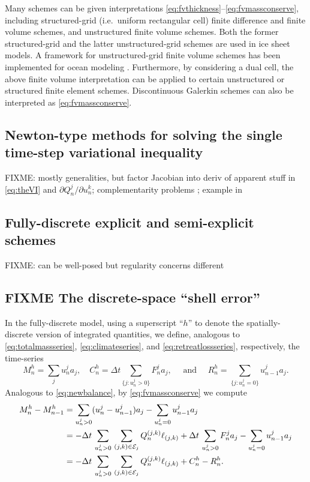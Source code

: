 \documentclass[final,leqno,onefignum,onetabnum]{siamltex1213bueler}
\begin{document}
Many schemes can be given interpretations \eqref{eq:fvthickness}--\eqref{eq:fvmassconserve}, including structured-grid (i.e.~uniform rectangular cell) finite difference \cite{MortonMayers2005} and finite volume \cite{LeVeque2002} schemes, and unstructured finite volume schemes.  Both the former structured-grid \cite{Winkelmannetal2011} and the latter unstructured-grid \cite{EgholmNielsen2010} schemes are used in ice sheet models.  A framework for unstructured-grid finite volume schemes has been implemented for ocean modeling \cite{Ringleretal2013}.  Furthermore, by considering a dual cell, the above finite volume interpretation can be applied to certain unstructured or structured finite element schemes.  Discontinuous Galerkin schemes can also be interpreted as \eqref{eq:fvmassconserve}.

\subsection{Newton-type methods for solving the single time-step variational inequality} \label{subsec:newtonvi}  FIXME: mostly generalities, but factor Jacobian into deriv of apparent stuff in \eqref{eq:theVI} and $\partial Q_n^j/\partial u_n^k$; complementarity problems \cite{BensonMunson2006,BillupsMurty2000}; example in \cite{Bueler2015}

\subsection{Fully-discrete explicit and semi-explicit schemes} \label{subsec:spaceexplicit}  FIXME:  can be well-posed but regularity concerns different



\subsection{FIXME The discrete-space ``shell error''}  \label{subsec:shellerror}  In the fully-discrete model, using a superscript ``$h$'' to denote the spatially-discrete version of integrated quantities, we define, analogous to \eqref{eq:totalmassseries}, \eqref{eq:climateseries}, and \eqref{eq:retreatlossseries}, respectively, the time-series
\begin{equation}
  M_n^h = \sum_j u_n^j a_j, \quad C_n^h = \Delta t\!\!\sum_{\{j:u_n^j>0\}} F_n^j a_j, \quad \text{ and } \quad R_n^h = \sum_{\{j:u_n^j=0\}} u_{n-1}^j a_j.  \label{eq:fvtimeseriesdefn}
\end{equation}
Analogous to \eqref{eq:newbalance}, by \eqref{eq:fvmassconserve} we compute
\begin{align}
M_n^h - M_{n-1}^h &= \sum_{u_n^j>0} (u_n^j - u_{n-1}^j) a_j - \sum_{u_n^j=0} u_{n-1}^j a_j \notag \\
   &= - \Delta t\,\sum_{u_n^j>0}\, \sum_{(j,k)\in\mathcal{E}_j} Q_n^{(j,k)} \ell_{(j,k)} + \Delta t\,\sum_{u_n^j>0} F_n^j a_j - \sum_{u_n^j=0} u_{n-1}^j a_j \notag \\
   &= - \Delta t\,\sum_{u_n^j>0}\, \sum_{(j,k)\in\mathcal{E}_j} Q_n^{(j,k)} \ell_{(j,k)} + C_n^h - R_n^h.  \label{eq:fvnewbalance}
\end{align}
\end{document}
